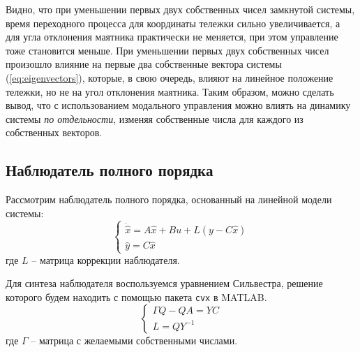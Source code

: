 Видно, что при уменьшении первых двух собственных чисел замкнутой системы, время переходного процесса для 
координаты тележки сильно увеличивается, а для угла отклонения маятника практически не меняется, при этом 
управление тоже становится меньше. При уменьшении первых двух собственных чисел произошло влияние на первые 
два собственные вектора системы (\ref{eq:eigenvectors}), которые, в свою очередь, влияют на 
линейное положение тележки, но не на угол отклонения маятника. Таким образом, можно сделать вывод, что 
с использованием модального управления можно влиять на динамику системы \textit{по отдельности}, изменяя 
собственные числа для каждого из собственных векторов.

\subsection{Наблюдатель полного порядка}
Рассмотрим наблюдатель полного порядка, основанный на линейной модели системы: 
\begin{equation}
    \begin{cases}
        \dot{\hat{x}} = A\hat{x} + Bu + L(y - C\hat{x})\\
        \hat{y} = C\hat{x}
    \end{cases}
\end{equation}
где $L$ -- матрица коррекции наблюдателя. 

Для синтеза наблюдателя воспользуемся уравнением Сильвестра, решение которого будем находить с помощью
пакета \texttt{cvx} в MATLAB.
\begin{equation}
    \begin{cases}
        \Gamma Q - QA = YC \\ 
        L = QY^{-1}
    \end{cases}
\end{equation}
где $\Gamma$ -- матрица с желаемыми собственными числами. 

